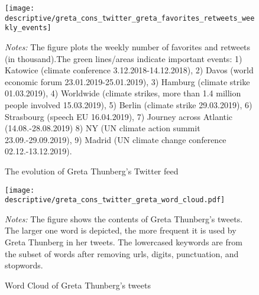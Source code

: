 \documentclass[11pt, a4paper]{article} %
\begin{document}
\begin{figure}[H]\centering
	\caption{The evolution of Greta Thunberg's Twitter feed}
	\texttt{[image: descriptive/greta\_cons\_twitter\_greta\_favorites\_retweets\_weekly\_events]}
	\begin{minipage}{\linewidth}
		\scriptsize{\emph{Notes:} The figure plots the weekly number of favorites and retweets (in thousand).The green lines/areas indicate important events: 1) Katowice (climate conference 3.12.2018-14.12.2018), 2) Davos (world economic forum 23.01.2019-25.01.2019), 3) Hamburg (climate strike 01.03.2019), 4) Worldwide (climate strikes, more than 1.4 million people involved 15.03.2019), 5) Berlin (climate strike 29.03.2019), 6) Strasbourg (speech EU 16.04.2019), 7) Journey across Atlantic (14.08.-28.08.2019) 8) NY (UN climate action summit 23.09.-29.09.2019), 9) Madrid (UN climate change conference 02.12.-13.12.2019).}
	\end{minipage}
\end{figure}


\begin{figure}[H]\centering
	\caption{Word Cloud of Greta Thunberg's tweets}
	\texttt{[image: descriptive/greta\_cons\_twitter\_greta\_word\_cloud.pdf]}
	\begin{minipage}{\linewidth}
		\scriptsize{\emph{Notes:} The figure shows the contents of Greta Thunberg's tweets. The larger one word is depicted, the more frequent it is used by Greta Thunberg in her tweets. The lowercased keywords are from the subset of words after removing urls, digits, punctuation, and stopwords.}
	\end{minipage}
\end{figure}
\end{document}
